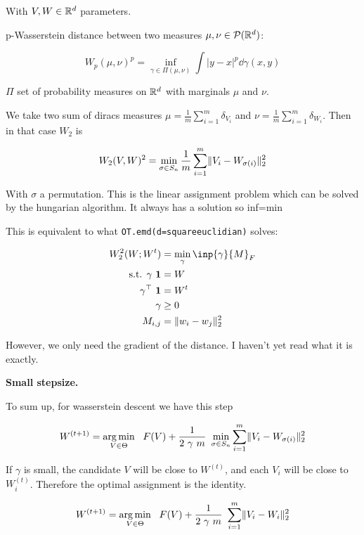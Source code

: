 With $V, W \in \mathbb{R}^d$ parameters.

p-Wasserstein distance between two measures $\mu, \nu \in \mathcal{P}(\mathbb{R}^d)$: 

\begin{equation}
	W_p(\mu, \nu)^p = \inf_{\gamma \in \Pi(\mu, \nu)} \int |y - x|^p \dd \gamma(x, y)
\end{equation}

$\Pi$ set of probability measures on $\mathbb{R}^d$ with marginals $\mu$ and $\nu$.

We take two sum of diracs measures $\mu = \frac{1}{m} \sum_{i=1}^{m} \delta_{V_i}$ and $\nu = \frac{1}{m} \sum_{i=1}^{m} \delta_{W_i}$. Then in that case $W_2$ is

\begin{equation}
	W_2(V, W)^2 = \min_{\sigma \in S_n} \frac{1}{m} \sum_{i=1}^{m} \lVert V_i - W_{\sigma(i)}\rVert^2_2
\end{equation}

With $\sigma$ a permutation. This is the linear assignment problem which can be solved by the hungarian algorithm. It always has a solution so inf=min

This is equivalent to what \texttt{OT.emd(d=squareeuclidian)} solves:

\begin{align}
	W_2^2(W; W^t) &= \min_{\gamma} \inp{\gamma}{M}_F \\
	\text{s.t.  } \gamma ~ \mathbf{1} &= W \\
	\gamma^\top ~ \mathbf{1} &= W^t \\
	\gamma &\geq 0 \\
	M_{i, j} &= \lVert w_i - w_j \rVert^2_2
\end{align}

However, we only need the gradient of the distance. I haven't yet read what it is exactly.

\textbf{Small stepsize.}

To sum up, for wasserstein descent we have this step

\begin{equation}
	W^{(t+1)} = \argmin_{V \in \Theta} \ \  F(V) + \frac{1}{2 ~ \gamma ~ m} ~ \min_{\sigma \in S_n} \sum_{i=1}^{m} \norm{V_i - W_{\sigma(i)}}^2_2
\end{equation}

If $\gamma$ is small, the candidate $V$ will be close to $W^{(t)}$, and each $V_i$ will be close to $W^{(t)}_i$. Therefore the optimal assignment is the identity.

\begin{equation}
	W^{(t+1)} = \argmin_{V \in \Theta} \ \  F(V) + \frac{1}{2 ~ \gamma ~ m} ~ \sum_{i=1}^{m} \norm{V_i - W_i}^2_2
\end{equation}

